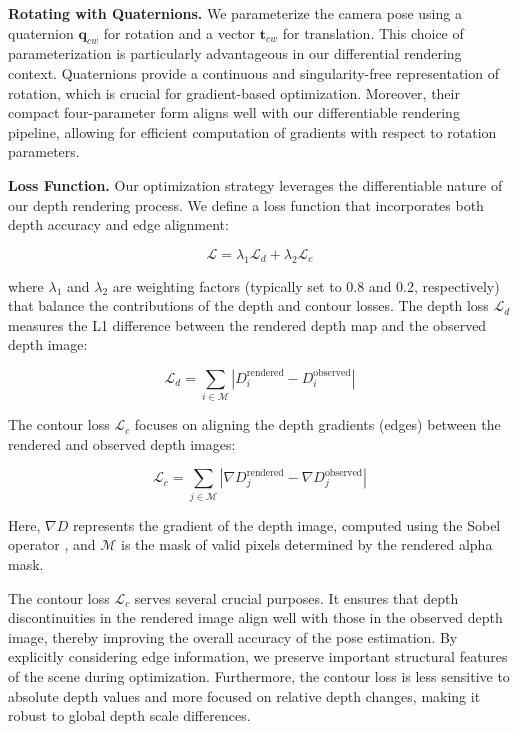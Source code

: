 \documentclass[twocolumn]{article} %
\begin{document}
\textbf{Rotating with
Quaternions.}\cite{kuipersQuaternionsRotationSequences1999} We
parameterize the camera pose using a quaternion \(\mathbf{q}_{cw}\) for
rotation and a vector \(\mathbf{t}_{cw}\) for translation. This choice
of parameterization is particularly advantageous in our differential
rendering context. Quaternions provide a continuous and singularity-free
representation of rotation, which is crucial for gradient-based
optimization. Moreover, their compact four-parameter form aligns well
with our differentiable rendering pipeline, allowing for efficient
computation of gradients with respect to rotation parameters.

\textbf{Loss Function.} Our optimization strategy leverages the
differentiable nature of our depth rendering process. We define a loss
function that incorporates both depth accuracy and edge alignment:

\[
\mathcal{L} = \lambda_1 \mathcal{L}_d + \lambda_2 \mathcal{L}_c
\]

where \(\lambda_1\) and \(\lambda_2\) are weighting factors (typically
set to 0.8 and 0.2, respectively) that balance the contributions of the
depth and contour losses. The depth loss \(\mathcal{L}_d\) measures the
L1 difference between the rendered depth map and the observed depth
image:

\[
\mathcal{L}_d = \sum_{i \in \mathcal{M}} \left| D_i^{\text{rendered}} - D_i^{\text{observed}} \right|
\]

The contour loss \(\mathcal{L}_c\) focuses on aligning the depth
gradients (edges) between the rendered and observed depth images:

\[
\mathcal{L}_c = \sum_{j \in \mathcal{M}} \left| \nabla D_j^{\text{rendered}} - \nabla D_j^{\text{observed}} \right|
\]

Here, \(\nabla D\) represents the gradient of the depth image, computed
using the Sobel operator \cite{kanopoulosDesignImageEdge1988}, and
\(\mathcal{M}\) is the mask of valid pixels determined by the rendered
alpha mask.

The contour loss \(\mathcal{L}_{c}\) serves several crucial purposes. It
ensures that depth discontinuities in the rendered image align well with
those in the observed depth image, thereby improving the overall
accuracy of the pose estimation. By explicitly considering edge
information, we preserve important structural features of the scene
during optimization. Furthermore, the contour loss is less sensitive to
absolute depth values and more focused on relative depth changes, making
it robust to global depth scale differences.
\end{document}
